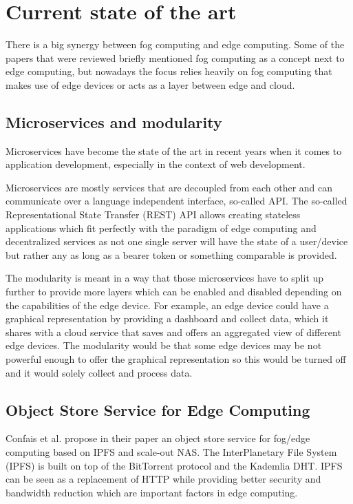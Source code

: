 \section{Current state of the art}\label{sec:evaluation} 


There is a big synergy between fog computing and edge computing. Some of the papers that were reviewed briefly mentioned fog computing as a concept next to edge computing, but nowadays the focus relies heavily on fog computing that makes use of edge devices or acts as a layer between edge and cloud.

\subsection{Microservices and modularity}
Microservices have become the state of the art in recent years when it comes to application development, especially in the context of web development.

Microservices are mostly services that are decoupled from each other and can communicate over a language independent interface, so-called API. The so-called Representational State Transfer (REST) API allows creating stateless applications which fit perfectly with the paradigm of edge computing and decentralized services as not one single server will have the state of a user/device but rather any as long as a bearer token or something comparable is provided.

The modularity is meant in a way that those microservices have to split up further to provide more layers which can be enabled and disabled depending on the capabilities of the edge device. For example, an edge device could have a graphical representation by providing a dashboard and collect data, which it shares with a cloud service that saves and offers an aggregated view of different edge devices. The modularity would be that some edge devices may be not powerful enough to offer the graphical representation so this would be turned off and it would solely collect and process data.

\subsection{Object Store Service for Edge Computing}
Confais et al. propose in their paper \cite{8014358} an object store service for fog/edge computing based on IPFS and scale-out NAS.
The InterPlanetary File System (IPFS) is built on top of the BitTorrent protocol and the Kademlia DHT. IPFS can be seen as a replacement of HTTP while providing better security and bandwidth reduction which are important factors in edge computing.

